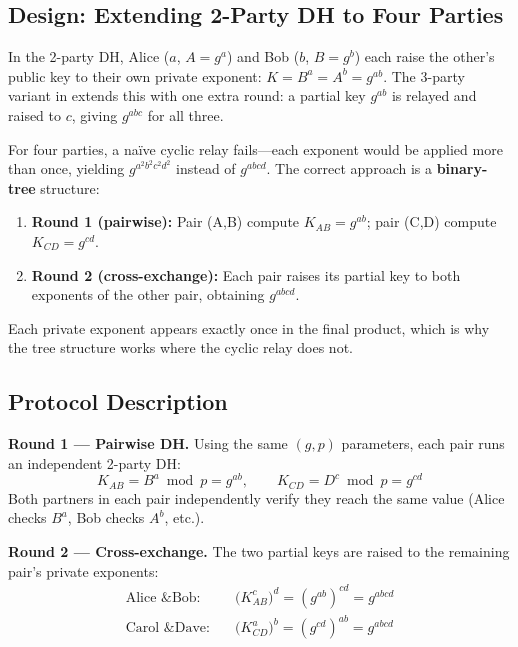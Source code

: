 \documentclass[twocolumn, 10pt]{article}
\begin{document}
\subsection{Design: Extending 2-Party DH to Four Parties}

In the 2-party DH, Alice ($a$, $A=g^a$) and Bob ($b$, $B=g^b$) each raise the other's public key to their own private exponent: $K = B^a = A^b = g^{ab}$. The 3-party variant in  extends this with one extra round: a partial key $g^{ab}$ is relayed and raised to $c$, giving $g^{abc}$ for all three.

For four parties, a na{\"i}ve cyclic relay fails---each exponent would be applied more than once, yielding $g^{a^2b^2c^2d^2}$ instead of $g^{abcd}$. The correct approach is a \textbf{binary-tree} structure:

\begin{enumerate}[leftmargin=*, itemsep=0pt, topsep=2pt]
    \item \textbf{Round 1 (pairwise):} Pair (A,B) compute $K_{AB}=g^{ab}$; pair (C,D) compute $K_{CD}=g^{cd}$.
    \item \textbf{Round 2 (cross-exchange):} Each pair raises its partial key to both exponents of the other pair, obtaining $g^{abcd}$.
\end{enumerate}

Each private exponent appears exactly once in the final product, which is why the tree structure works where the cyclic relay does not.

\subsection{Protocol Description}

\textbf{Round 1 --- Pairwise DH.} Using the same $(g, p)$ parameters, each pair runs an independent 2-party DH:
\[
K_{AB} = B^a \bmod p = g^{ab}, \qquad K_{CD} = D^c \bmod p = g^{cd}
\]
Both partners in each pair independently verify they reach the same value (Alice checks $B^a$, Bob checks $A^b$, etc.).

\textbf{Round 2 --- Cross-exchange.} The two partial keys are raised to the remaining pair's private exponents:
\begin{align*}
\text{Alice \& Bob:}&\quad \bigl(K_{AB}^c\bigr)^d = (g^{ab})^{cd} = g^{abcd}\\
\text{Carol \& Dave:}&\quad \bigl(K_{CD}^a\bigr)^b = (g^{cd})^{ab} = g^{abcd}
\end{align*}
\end{document}

